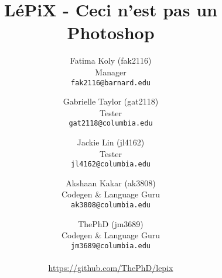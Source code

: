 \documentclass[11pt,letterpaper]{report}
\author{
	Fatima Koly (fak2116)\\
	Manager\\
	\texttt{fak2116@barnard.edu}
	\and
	Gabrielle Taylor (gat2118)\\
	Tester\\
	\texttt{gat2118@columbia.edu}
	\and
	Jackie Lin (jl4162)\\
	Tester\\
	\texttt{jl4162@columbia.edu}
	\and
	Akshaan Kakar (ak3808)\\ 
	Codegen \& Language Guru\\
	\texttt{ak3808@columbia.edu}
	\and
	ThePhD (jm3689)\\
	Codegen \& Language Guru\\
	\texttt{jm3689@columbia.edu}
	\\\\
	\url{https://github.com/ThePhD/lepix}
}
\title{LéPiX - Ceci n'est pas un Photoshop}
\begin{document}
	\renewcommand{\arraystretch}{1.1}
	\newcommand{\lepix}{LéPiX}
	\maketitle
	\tableofcontents
	\pagebreak
	
	
	
	
	
	
\end{document}
